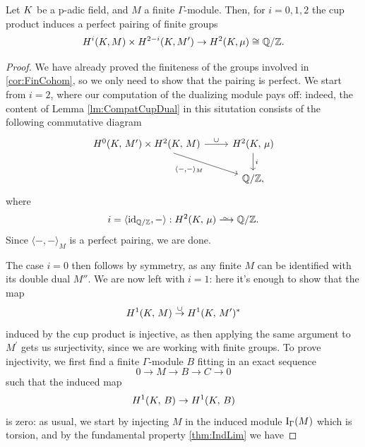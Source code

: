 \documentclass[a4paper, oneside]{memoir}
\begin{document}
\begin{theorem}
    Let $K$ be a p-adic field, and $M$ a finite $\Gamma$-module.
    Then, for $i=0,1,2$ the cup product induces a perfect pairing of finite groups
    \begin{equation*}
        H^i(K, M) \times H^{2-i}(K, M^{\prime}) \to H^2(K, \mu) \cong \mathbb{Q}/\mathbb{Z}.
    \end{equation*}
\end{theorem}
\begin{proof}
    We have already proved the finiteness of the groups involved in \ref{cor:FinCohom}, so we only need to show that the pairing is perfect.
    We start from $i=2$, where our computation of the dualizing module pays off: indeed, the content of Lemma \ref{lm:CompatCupDual}
    in this situtation consists of the following commutative diagram
    \begin{equation*}
        \begin{tikzcd}
            {\H{0}{\K}{M^\prime}  \times \HH{\K}{M}} \ar[swap, rd, "\langle - {,} - \rangle_M "] \ar[r, "\cup"] & \HH{\K}{\mu} \ar[d, "i"] \\
            & \Q/\Z,
        \end{tikzcd}
    \end{equation*}
    where
    \[
        i = \langle \id_{\Q/\Z}, - \rangle : \H{2}{\K}{\mu} \Iso \Q/\Z.
    \]
    Since \(\langle -{,}- \rangle_M\) is a perfect pairing, we are done.

    The case $i=0$ then follows by symmetry, as any finite $M$ can be identified with its double dual $M''$.
    We are now left with $i=1$: here it's enough to show that the map
    \[
        H^{1}( K, \, M ) \overset{\cup}{\to} H^{1}( K, \, M^\prime )^*
    \]
    induced by the cup product is injective, as then applying the same argument to $M^\prime$ gets us surjectivity, since we are working with finite groups.
    To prove injectivity, we first find a finite $\Gamma$-module $B$ fitting in an exact sequence
    \begin{equation}\label{eq:InjSeq}
        0\to M\to B\to C\to 0
    \end{equation}
    such that the induced map
    \[
        H^{1}( K, \, B )\to H^{1}( K, \, B )
    \]
    is zero:
    as usual, we start by injecting $M$ in the induced module $\mathrm{I}_{\Gamma}(M)$ which is torsion, and by the fundamental property \ref{thm:IndLim} we have


\end{proof}
\end{document}

